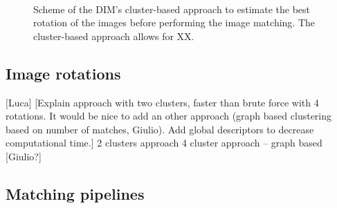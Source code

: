 \begin{figure}[ht]
  \centering
   \\
  \caption{Scheme of the DIM's cluster-based approach to estimate the best rotation of the images before performing the image matching. 
    The cluster-based approach allows for XX.
  }
  \label{fig:5:dim_rotations}
\end{figure}

\subsection{Image rotations}
[Luca] [Explain approach with two clusters, faster than brute force with 4 rotations. 
It would be nice to add an other approach (graph based clustering based on number of matches, Giulio). 
Add global descriptors to decrease computational time.] 
    2 clusters approach 
    4 cluster approach – graph based [Giulio?] 

\subsection{Matching pipelines}

